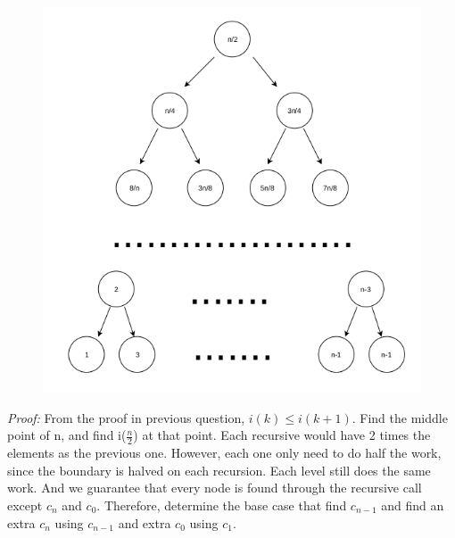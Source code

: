 \documentclass{article}
\begin{document}
\begin{enumerate}
\begin{figure}
    \includegraphics[scale = 0.4]{tree.png}
    \centering
\end{figure}

\textit{Proof:} From the proof in previous question, $i(k) \leq i(k+1)$. Find the middle point
of n, and find i($\frac{n}{2}$) at that point. Each recursive would have 2 times the elements
as the previous one. However, each one only need to do half the work, since the boundary is halved
on each recursion. Each level still does the same work. And we guarantee that every node is
found through the recursive call except $c_n$ and $c_0$. Therefore, determine the base case that find $c_{n-1}$
and find an extra $c_n$ using $c_{n-1}$ and extra $c_0$ using $c_1$.
\end{enumerate}
\end{document}
